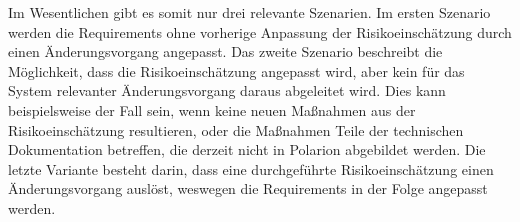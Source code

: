 \documentclass[a4paper,12pt]{report}
\begin{document}

Im Wesentlichen gibt es somit nur drei relevante Szenarien. Im ersten Szenario werden die Requirements ohne vorherige Anpassung der Risikoeinschätzung durch einen Änderungsvorgang angepasst. Das zweite Szenario beschreibt die Möglichkeit, dass die Risikoeinschätzung angepasst wird, aber kein für das System relevanter Änderungsvorgang daraus abgeleitet wird. Dies kann beispielsweise der Fall sein, wenn keine neuen Maßnahmen aus der Risikoeinschätzung resultieren, oder die Maßnahmen Teile der technischen Dokumentation betreffen, die derzeit nicht in Polarion abgebildet werden. Die letzte Variante besteht darin, dass eine durchgeführte Risikoeinschätzung einen Änderungsvorgang auslöst, weswegen die Requirements in der Folge angepasst werden.
\end{document}
